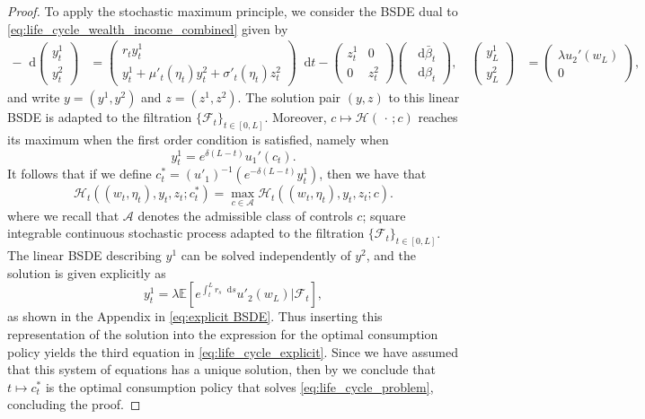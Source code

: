 \documentclass[11pt,oneside,english,reqno,dvipsnames,table]{amsart}
\numberwithin{equation}{section}
\theoremstyle{plain}
\theoremstyle{definition}
\theoremstyle{remark}
\theoremstyle{plain}
\theoremstyle{plain}
\theoremstyle{plain}
\theoremstyle{plain}
\theoremstyle{plain}
\theoremstyle{plain}
\theoremstyle{plain}
\newcommand{\cA}{\mathcal{A}}
\newcommand{\cF}{\mathcal{F}}
\newcommand{\dd}{\mathop{}\!\mathrm{d}}
\newcommand{\mcH}{\mathcal{H}}
\newcommand{\mbE}{\mathbb{E}}
\numberwithin{thm}{section}
\begin{document}
\begin{proof}
To apply the stochastic maximum principle, we 
consider the BSDE dual to \eqref{eq:life_cycle_wealth_income_combined} given by 
%
\begin{equation*}
\begin{aligned}
    - \dd \begin{pmatrix}
        y^1_t \\
        y^2_t
    \end{pmatrix} &= \begin{pmatrix}
        r_t y^1_t \\
        y^1_t + \mu'_t(\eta_t) y^2_t + \sigma'_t(\eta_t) z^2_t
    \end{pmatrix} \dd t -\begin{pmatrix}
        z^1_t & 0\\
        0 &z^2_t
    \end{pmatrix} \begin{pmatrix}
        \dd \bar{\beta}_t\\
        \dd \beta_t
    \end{pmatrix},\quad
    \begin{pmatrix}
        y^1_L\\
        y^2_L
    \end{pmatrix} &= \begin{pmatrix}
        \lambda u_2'(w_L)\\
        0
    \end{pmatrix},
\end{aligned}
\end{equation*}
and write $y=(y^1,y^2)$ and $z=(z^1,z^2)$.
The solution pair $(y,z)$ to this linear BSDE is adapted to the filtration $\{\cF_t\}_{t\in [0,L]}$. Moreover, $c \mapsto \mcH(\,\cdot\,;c)$ reaches its maximum when the first order condition is satisfied,  namely when 
%
\begin{equation*} 
y^1_t =e^{\delta(L-t)} u_1'(c_t). 
\end{equation*}
%
It follows that if we define 
$c^*_t = (u'_1)^{-1}(e^{-\delta (L-t)}y_t^1)$, 
then we have that 
%
\begin{equation*}
    \mcH_t((w_t,\eta_t),y_t,z_t;c^*_t) = \max_{c\in \cA}\mcH_t((w_t,\eta_t),y_t,z_t;c). 
\end{equation*}
%
where we recall that $\cA$ denotes the admissible class of controls $c $;  square integrable continuous  stochastic process adapted to the filtration $\{\cF_t\}_{t\in [0,L]}$. 
The linear BSDE describing $y^1$ can be solved independently of $y^2$, and the solution is given explicitly as
%
\begin{equation*}
    y_t^1=\lambda \mbE[e^{\int_t^L r_s\dd s} u'_2(w_L)|\cF_t],  
\end{equation*}
%
as shown in the Appendix in \eqref{eq:explicit BSDE}. Thus inserting this representation of the solution into the expression for the optimal consumption policy yields the third equation in \eqref{eq:life_cycle_explicit}.
 Since we have assumed that this system of equations  has a unique solution, then 
by  \cite[Thm.~6.4.6]{pham_09_continuous} we conclude that $t\mapsto c^*_t$ is the optimal consumption policy that solves \eqref{eq:life_cycle_problem}, concluding the proof.
%
\end{proof}
%
\end{document}
